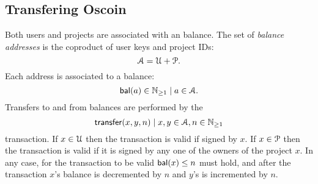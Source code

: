 
\def\posnat{\mathbb{N}_{\geq 1}}

\subsection{Transfering Oscoin}

Both users and projects are associated with an \oscoin{} balance.  The
set of \emph{balance addresses} is the coproduct of user keys and
project IDs:
\[
\mathcal{A} = \mathcal{U} + \mathcal{P}.
\]
Each address is associated to a balance:
\[
\bal(a) \in \posnat \mid a \in \accAddrs.
\]
Transfers to and from balances are performed by the
\[
\mathsf{transfer}\small{\lparen x,y,n\rparen} \mid x,y \in \mathcal{A}, n \in \mathbb{N}_{\geq 1}
\]
transaction. If $x \in \mathcal{U}$ then the transaction is valid if signed
by $x$. If $x \in \mathcal{P}$ then the transaction is valid if it is
signed by any one of the owners of the project $x$. In any case, for
the transaction to be valid $\mathsf{bal}(x) \leq n$ must hold, and after the
transaction $x$'s balance is decremented by $n$ and $y$'s is
incremented by $n$.

